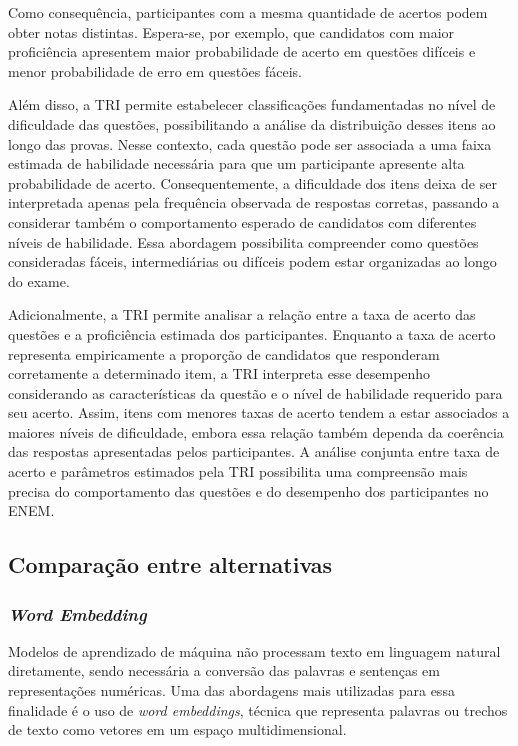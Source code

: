 \documentclass[a4paper,10pt, twocolumn]{article}
\begin{document}
Como consequência, participantes com a mesma quantidade de acertos podem obter notas distintas. Espera-se, por exemplo, que candidatos com maior proficiência apresentem maior probabilidade de acerto em questões difíceis e menor probabilidade de erro em questões fáceis.

Além disso, a TRI permite estabelecer classificações fundamentadas no nível de dificuldade das questões, possibilitando a análise da distribuição desses itens ao longo das provas. Nesse contexto, cada questão pode ser associada a uma faixa estimada de habilidade necessária para que um participante apresente alta probabilidade de acerto. Consequentemente, a dificuldade dos itens deixa de ser interpretada apenas pela frequência observada de respostas corretas, passando a considerar também o comportamento esperado de candidatos com diferentes níveis de habilidade. Essa abordagem possibilita compreender como questões consideradas fáceis, intermediárias ou difíceis podem estar organizadas ao longo do exame.

Adicionalmente, a TRI permite analisar a relação entre a taxa de acerto das questões e a proficiência estimada dos participantes. Enquanto a taxa de acerto representa empiricamente a proporção de candidatos que responderam corretamente a determinado item, a TRI interpreta esse desempenho considerando as características da questão e o nível de habilidade requerido para seu acerto. Assim, itens com menores taxas de acerto tendem a estar associados a maiores níveis de dificuldade, embora essa relação também dependa da coerência das respostas apresentadas pelos participantes. A análise conjunta entre taxa de acerto e parâmetros estimados pela TRI possibilita uma compreensão mais precisa do comportamento das questões e do desempenho dos participantes no ENEM.

\subsection{Comparação entre alternativas}
\subsubsection{\textit{Word Embedding}}
Modelos de aprendizado de máquina não processam texto em linguagem natural diretamente, sendo necessária a conversão das palavras e sentenças em representações numéricas. Uma das abordagens mais utilizadas para essa finalidade é o uso de \textit{word embeddings}, técnica que representa palavras ou trechos de texto como vetores em um espaço multidimensional. \cite{jm3}
\end{document}
